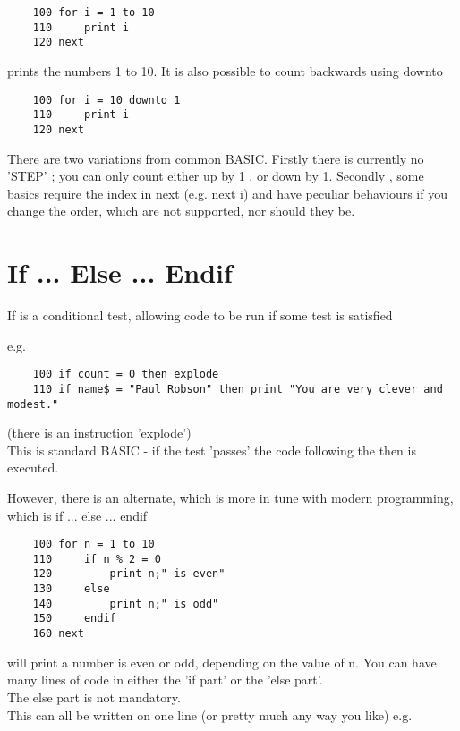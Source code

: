 \begin{verbatim}
	100 for i = 1 to 10
	110 	print i
	120	next
\end{verbatim}

prints the numbers 1 to 10. It is also possible to count backwards using downto

\begin{verbatim}
	100 for i = 10 downto 1
	110 	print i
	120	next
\end{verbatim}

There are two variations from common BASIC. Firstly there is currently no 'STEP' ; you can only count either up by 1 , or down by 1. Secondly , some basics require the index in next (e.g. next i) and have peculiar behaviours if you change the order, which are not supported, nor should they be.

\section{If ... Else ... Endif}

If is a conditional test, allowing code to be run if some test is satisfied

e.g.

\begin{verbatim}
	100 if count = 0 then explode
	110 if name$ = "Paul Robson" then print "You are very clever and modest."
\end{verbatim}

(there is an instruction 'explode')\\

This is standard BASIC - if the test 'passes' the code following the then is executed. 

However, there is an alternate, which is more in tune with modern programming, which is if ... else ... endif

\begin{verbatim}
	100 for n = 1 to 10
	110 	if n % 2 = 0
	120    		print n;" is even"
	130 	else
	140    		print n;" is odd"
	150 	endif
	160 next
\end{verbatim}

will print a number is even or odd, depending on the value of n. You can have many lines of code in either the 'if part' or the 'else part'. \\

The else part is not mandatory.\\

This can all be written on one line (or pretty much any way you like) e.g. \\

